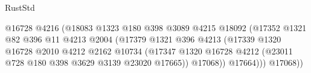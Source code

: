 \begin{lexlean}{RustStd}
\begin{coremodule}
                                                  @16728
                                                  @4216
                                                  (@18083
                                                    @1323
                                                    @180
                                                    @398
                                                    @3089
                                                    @4215
                                                    @18092
                                                    (@17352
                                                      @1321
                                                      @82
                                                      @396
                                                      @11
                                                      @4213
                                                      @2004
                                                      (@17379
                                                        @1321
                                                        @396
                                                        @4213
                                                        (@17339
                                                          @1320
                                                          @16728
                                                          @2010
                                                          @4212
                                                          @2162
                                                          @10734
                                                          (@17347
                                                            @1320
                                                            @16728
                                                            @4212
                                                            (@23011
                                                              @728
                                                              @180
                                                              @398
                                                              @3629
                                                              @3139
                                                              @23020
                                                              @17665))
                                                          @17068))
                                                      @17664)))
                                                @17068))

\end{coremodule}
\end{lexlean}
